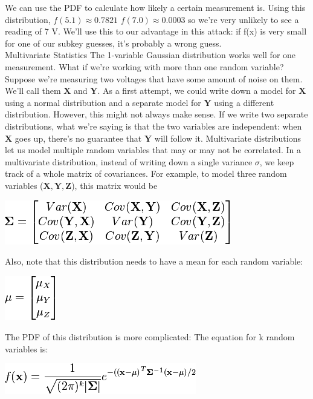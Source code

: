     We can use the PDF to calculate how likely a certain measurement is. Using
    this distribution, $f(5.1) \approx 0.7821$ $f(7.0) \approx 0.0003$ so we're
    very unlikely to see a reading of 7 V. We'll use this to our advantage in
    this attack: if f(x) is very small for one of our subkey guesses, it's
    probably a wrong guess.\\
    Multivariate Statistics The 1-variable Gaussian distribution works well for
    one measurement. What if we're working with more than one random variable?
    Suppose we're measuring two voltages that have some amount of noise on them.
    We'll call them $\mathbf{X}$ and $\mathbf{Y}$. As a first attempt, we could
    write down a model for $\mathbf{X}$ using a normal distribution and a
    separate model for $\mathbf{Y}$ using a different distribution. However,
    this might not always make sense. If we write two separate distributions,
    what we're saying is that the two variables are independent: when
    $\mathbf{X}$ goes up, there's no guarantee that $\mathbf{Y}$ will follow it.
    Multivariate distributions let us model multiple random variables that may
    or may not be correlated. In a multivariate distribution, instead of writing
    down a single variance $\sigma$, we keep track of a whole matrix of
    covariances. For example, to model three random variables ($\mathbf{X},
    \mathbf{Y}, \mathbf{Z}$), this matrix would be\\
    \begin{minipage}{\linewidth}
      \centering
      \includegraphics{images/Lecture_5/cov.png}
      \end{minipage}
    Also, note that this distribution needs to have a mean for each random
    variable:\\
       \begin{minipage}{\linewidth}
      \centering
      \includegraphics{images/Lecture_5/mu.png}
      \end{minipage}
    The PDF of this distribution is more complicated: The equation for k random
    variables is:\\
     \begin{minipage}{\linewidth}
      \centering
      \includegraphics{images/Lecture_5/dist.png}
      \end{minipage}


